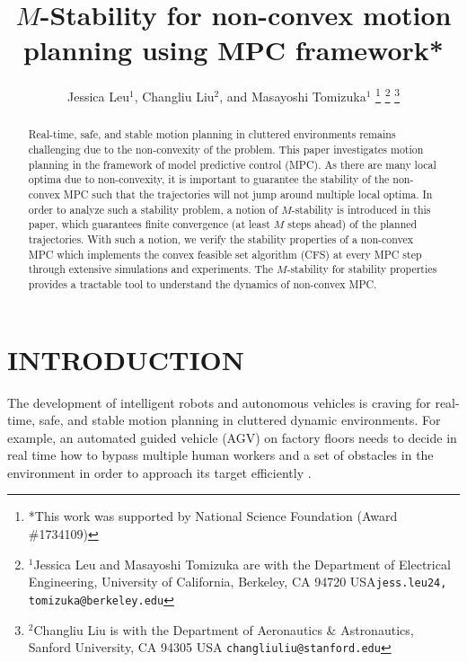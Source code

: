 \documentclass[letterpaper, 10 pt, conference]{ieeeconf}  %
\title{\LARGE \bf
$M$-Stability for non-convex motion planning using MPC framework*
}
\author{ Jessica Leu$^{1}$, Changliu Liu$^{2}$,  and Masayoshi Tomizuka$^{1}$%
\thanks{*This work was supported by National Science Foundation (Award \#1734109)}%
\thanks{$^{1}$Jessica Leu and Masayoshi Tomizuka are with the Department of Electrical Engineering, University of California,
Berkeley, CA 94720 USA{\tt\small jess.leu24, tomizuka@berkeley.edu}}%
\thanks{$^{2}$Changliu Liu is with the Department of Aeronautics \& Astronautics, Sanford University, CA 94305 USA
        {\tt\small changliuliu@stanford.edu}}%
}
\begin{document}
\maketitle
\thispagestyle{empty}
\pagestyle{empty}


\begin{abstract}

Real-time, safe, and stable motion planning in cluttered environments remains challenging due to the non-convexity of the problem. This paper investigates motion planning in the framework of model predictive control (MPC). As there are many local optima due to non-convexity, it is important to guarantee the stability of the non-convex MPC such that the trajectories will not jump around multiple local optima. In order to analyze such a stability problem, a notion of $M$-stability is introduced in this paper, which guarantees finite convergence (at least $M$ steps ahead) of the planned trajectories. With such a notion, we verify the stability properties of a non-convex MPC which implements the convex feasible set algorithm (CFS) at every MPC step through extensive simulations and experiments. The $M$-stability for stability properties provides a tractable tool to understand the dynamics of non-convex MPC.
\end{abstract}


\section{INTRODUCTION}

The development of intelligent robots and autonomous vehicles is craving for real-time, safe, and stable motion planning in cluttered dynamic environments. For example, an automated guided vehicle (AGV) on factory floors \cite{wu2004modeling} needs to decide in real time how to bypass multiple human workers and a set of obstacles in the environment in order to approach its target efficiently \cite{wang2009autonomous,oleari2014industrial}. 
\end{document}
